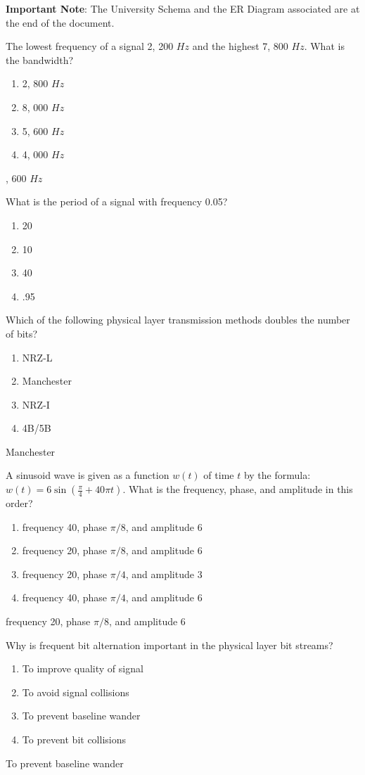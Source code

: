 \documentclass[a4 paper]{article}
\begin{document}
\textbf{Important Note}: The University Schema and the ER Diagram associated are at the end of the document.

The lowest frequency of a signal 2, 200 $Hz$ and the highest 7, 800 $Hz$.
What is the bandwidth?
\begin{enumerate}
	\item 2, 800 $Hz$
	\item 8, 000 $Hz$
	\item 5, 600 $Hz$
	\item 4, 000 $Hz$
\end{enumerate}
, 600 $Hz$

What is the period of a signal with frequency 0.05?
\begin{enumerate}
	\item 20
	\item 10
	\item 40
	\item .95
\end{enumerate}

Which of the following physical layer transmission methods doubles the number of bits?
\begin{enumerate}
	\item NRZ-L
	\item Manchester
	\item NRZ-I
	\item 4B/5B
\end{enumerate}
\solution Manchester

A sinusoid wave is given as a function $w(t)$ of time $t$ by the formula: $w(t)=6\sin(\frac{\pi}{4}+40\pi t)$. What is the frequency, phase, and amplitude in this order?
\begin{enumerate}
	\item frequency 40, phase $\pi/8$, and amplitude 6
	\item frequency 20, phase $\pi/8$, and amplitude 6
	\item frequency 20, phase $\pi/4$, and amplitude 3
	\item frequency 40, phase $\pi/4$, and amplitude 6
\end{enumerate}
\solution frequency 20, phase $\pi/8$, and amplitude 6

Why is frequent bit alternation important in the physical layer bit streams?
\begin{enumerate}
	\item To improve quality of signal
	\item To avoid signal collisions
	\item To prevent baseline wander
	\item To prevent bit collisions
\end{enumerate}
\solution To prevent baseline wander
\end{document}

